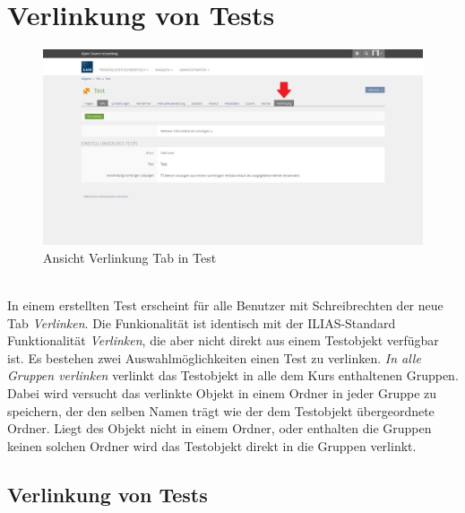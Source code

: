 \chapter{Verlinkung von Tests}\label{linkTest}
\begin{figure}[h!]
	\centering
	\includegraphics[width=1\textwidth]{img/Test.jpg}
	\caption{Ansicht Verlinkung Tab in Test}
\end{figure}

~\\In einem erstellten Test erscheint für alle Benutzer mit Schreibrechten der neue Tab \textit{Verlinken}. Die Funkionalität ist identisch mit der ILIAS-Standard Funktionalität \textit{Verlinken}, die aber nicht direkt aus einem Testobjekt verfügbar ist. Es bestehen zwei Auswahlmöglichkeiten einen Test zu verlinken. \textit{In alle Gruppen verlinken} verlinkt das Testobjekt in alle dem Kurs enthaltenen Gruppen. Dabei wird versucht das verlinkte Objekt in einem Ordner in jeder Gruppe zu speichern, der den selben Namen trägt wie der dem Testobjekt übergeordnete Ordner. Liegt des  Objekt nicht in einem Ordner, oder enthalten die Gruppen keinen solchen Ordner wird das Testobjekt direkt in die Gruppen verlinkt. 
\newpage

\section{Verlinkung von Tests}


